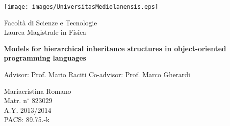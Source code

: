 {
\thispagestyle{empty}

\centerline{
\texttt{[image: images/UniversitasMediolanensis.eps]}
}

\begin{center}
{\large Facolt\`a di Scienze e Tecnologie\\
\vskip0.2cm Laurea Magistrale in Fisica }
\end{center}


\vskip1.5cm
\begin{center}
\huge \textbf{Models for hierarchical inheritance structures in object-oriented programming languages}
\end{center}

{\large
\vskip20mm Advisor:  Prof. Mario Raciti
\vskip 1mm Co-advisor: Prof. Marco Gherardi\\
}

\vskip0.7cm
\hskip8cm\parbox[t]{7cm}
{\large 
Mariacristina Romano\\
Matr. n$^\circ$ $823029$\\
A.Y. $2013$/$2014$\\
\vskip 0.5mm PACS: 89.75.-k
}

\newpage
\newpage
\thispagestyle{empty}
\clearpage
}

